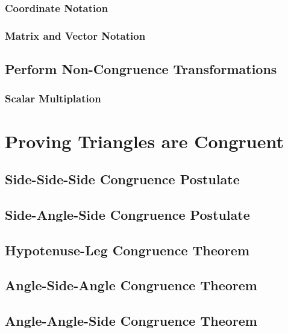 \documentclass[]{book}
\begin{document}
\subsubsection{Coordinate Notation}\label{coordinate-notation}

\subsubsection{Matrix and Vector
Notation}\label{matrix-and-vector-notation}

\subsection{Perform Non-Congruence
Transformations}\label{perform-non-congruence-transformations}

\subsubsection{Scalar Multiplation}\label{scalar-multiplation}

\section{Proving Triangles are
Congruent}\label{proving-triangles-are-congruent}

\subsection{Side-Side-Side Congruence
Postulate}\label{side-side-side-congruence-postulate}

\subsection{Side-Angle-Side Congruence
Postulate}\label{side-angle-side-congruence-postulate}

\subsection{Hypotenuse-Leg Congruence
Theorem}\label{hypotenuse-leg-congruence-theorem}

\subsection{Angle-Side-Angle Congruence
Theorem}\label{angle-side-angle-congruence-theorem}

\subsection{Angle-Angle-Side Congruence
Theorem}\label{angle-angle-side-congruence-theorem}
\end{document}
